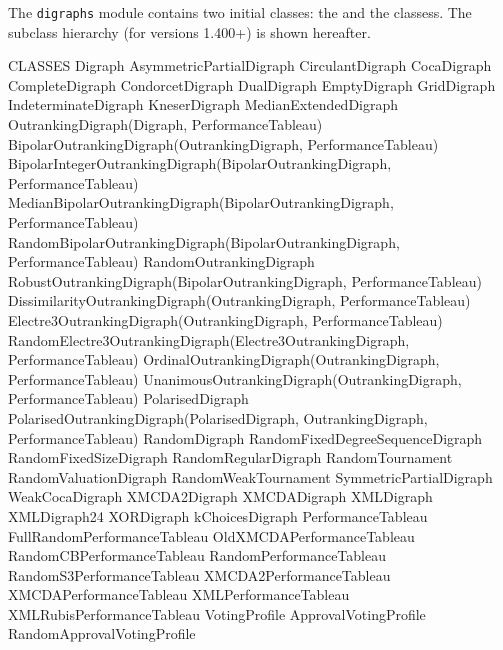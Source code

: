 \documentclass{article}
\newcommand{\+}{\verb+}
\renewcommand{\*}{\back{}}
\newcommand{\Dg}{\texttt{digraphs}\xspace }
\begin{document}
\begin{center}
The \Dg module contains two initial classes: the  and the  classess. The subclass hierarchy (for versions 1.400+) is shown hereafter.
\begin{example}
CLASSES
       Digraph
            AsymmetricPartialDigraph
            CirculantDigraph
            CocaDigraph
            CompleteDigraph
            CondorcetDigraph
            DualDigraph
            EmptyDigraph
            GridDigraph
            IndeterminateDigraph
            KneserDigraph
            MedianExtendedDigraph
            OutrankingDigraph(Digraph, PerformanceTableau)
                BipolarOutrankingDigraph(OutrankingDigraph, PerformanceTableau)
                    BipolarIntegerOutrankingDigraph(BipolarOutrankingDigraph, 
                                                    PerformanceTableau)
                    MedianBipolarOutrankingDigraph(BipolarOutrankingDigraph, 
                                                   PerformanceTableau)
                    RandomBipolarOutrankingDigraph(BipolarOutrankingDigraph, 
                                                   PerformanceTableau)
                        RandomOutrankingDigraph
                    RobustOutrankingDigraph(BipolarOutrankingDigraph, 
                                            PerformanceTableau)
                DissimilarityOutrankingDigraph(OutrankingDigraph, 
                                               PerformanceTableau)
                Electre3OutrankingDigraph(OutrankingDigraph, 
                                          PerformanceTableau)
                    RandomElectre3OutrankingDigraph(Electre3OutrankingDigraph, 
                                                    PerformanceTableau)
                OrdinalOutrankingDigraph(OutrankingDigraph, 
                                         PerformanceTableau)
                UnanimousOutrankingDigraph(OutrankingDigraph, 
                                           PerformanceTableau)
            PolarisedDigraph
                PolarisedOutrankingDigraph(PolarisedDigraph, 
                                           OutrankingDigraph, 
                                           PerformanceTableau)
            RandomDigraph
            RandomFixedDegreeSequenceDigraph
            RandomFixedSizeDigraph
            RandomRegularDigraph
            RandomTournament
            RandomValuationDigraph
            RandomWeakTournament
            SymmetricPartialDigraph
            WeakCocaDigraph
            XMCDA2Digraph
            XMCDADigraph
            XMLDigraph
            XMLDigraph24
            XORDigraph
            kChoicesDigraph
        PerformanceTableau
            FullRandomPerformanceTableau
            OldXMCDAPerformanceTableau
            RandomCBPerformanceTableau
            RandomPerformanceTableau
            RandomS3PerformanceTableau
            XMCDA2PerformanceTableau
            XMCDAPerformanceTableau
            XMLPerformanceTableau
            XMLRubisPerformanceTableau
        VotingProfile
        ApprovalVotingProfile
            RandomApprovalVotingProfile



\end{example}
\end{center}
\end{document}
